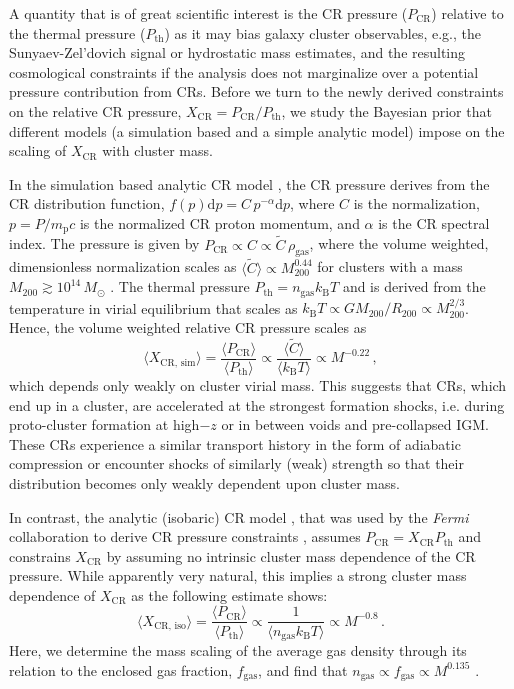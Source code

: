 \documentclass[10pt,aps,pra,reprint,amsmath,amsfonts,amssymb,showpacs,nofootinbib,floatfix]{revtex4-1}
\newcommand{\Fermi}{{\em Fermi}\xspace}
\newcommand{\rmn}{\mathrm}
\newcommand{\msun}{M_\odot}
\newcommand{\B}{\rmn{B}}
\newcommand{\bra}{\langle}
\newcommand{\ket}{\rangle}
\newcommand{\dd}{\rmn{d}}
\newcommand{\CR}{\rmn{CR}}
\newcommand{\mvir}{M_{200}}
\begin{document}
{A quantity that is of great scientific interest is the CR pressure
($P_\CR$) relative to the thermal pressure ($P_\rmn{th}$) as it may
bias galaxy cluster observables, e.g., the Sunyaev-Zel’dovich signal
or hydrostatic mass estimates, and the resulting cosmological
constraints if the analysis does not marginalize over a potential
pressure contribution from CRs. Before we turn to the newly derived
constraints on the relative CR pressure, $X_\CR = P_\CR/P_\rmn{th}$,
we study the Bayesian prior that different models (a simulation based
and a simple analytic model) impose on the scaling of $X_\CR$ with
cluster mass.

In the simulation based analytic CR model \cite{2010MNRAS.409..449P},
the CR pressure derives from the CR distribution function, $f(p)\dd p =
C\,p^{-\alpha}\dd p$, where $C$ is the normalization, $p=P/m_\rmn{p}
c$ is the normalized CR proton momentum, and $\alpha$ is the CR
spectral index. The pressure is given by $P_\CR \propto C\propto
\tilde{C} \,\rho_\rmn{gas}$, where the volume weighted, dimensionless
normalization scales as $\bra\tilde{C}\ket\propto \mvir^{0.44}$ for clusters
with a mass $\mvir\gtrsim 10^{14}\,\msun$
\cite{2010MNRAS.409..449P}. The thermal pressure $P_\rmn{th} =
n_\rmn{gas} k_\B T$ and is derived from the temperature in virial
equilibrium that scales as $k_\B T \propto G \mvir/R_{200} \propto
\mvir^{2/3}$. Hence, the volume weighted relative CR pressure scales
as
\begin{equation}
    \bra X_{\CR,\,\rmn{sim}}\ket = \frac{\bra P_\CR\ket}{\bra
      P_\rmn{th}\ket} \propto \frac{\bra\tilde{C}\ket}{\bra k_\B
      T\ket} \propto M^{-0.22}\,,
\end{equation}
which depends only weakly on cluster virial mass. This suggests that
CRs, which end up in a cluster, are accelerated at the strongest
formation shocks, i.e. during proto-cluster formation at high$-z$ or
in between voids and pre-collapsed IGM. These CRs experience a
similar transport history in the form of adiabatic compression or
encounter shocks of similarly (weak) strength so that their
distribution becomes only weakly dependent upon cluster mass.

In contrast, the analytic (isobaric) CR model
\cite{2004A&A...413...17P}, that was used by the \Fermi collaboration
to derive CR pressure constraints \cite{2010ApJ...717L..71A}, assumes
$P_\CR = X_\CR P_\rmn{th}$ and constrains $X_\CR$ by assuming no
intrinsic cluster mass dependence of the CR pressure. While
apparently very natural, this implies a strong cluster mass dependence
of $X_\CR$ as the following estimate shows:
\begin{equation}
    \bra X_{\CR,\,\rmn{iso}}\ket = \frac{\bra P_\CR\ket}{\bra P_\rmn{th}\ket}
    \propto \frac{1}{\bra n_\rmn{gas} k_\B T\ket} \propto M^{-0.8}\,.
\end{equation}
Here, we determine the mass scaling of the average gas density through
its relation to the enclosed gas fraction, $f_\rmn{gas}$, and find
that $n_\rmn{gas}\propto f_\rmn{gas} \propto M^{0.135}$
\cite{2009ApJ...693.1142S}.

}
\end{document}
